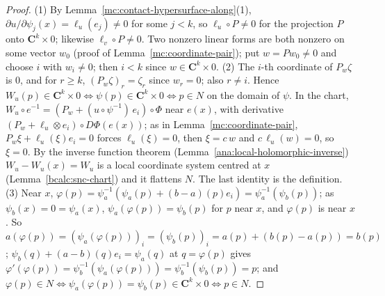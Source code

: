 \begin{proof}
\leanok
(1) By Lemma~\ref{mc:contact-hypersurface-along}(1), \(\partial u/\partial\psi_j(x)=\ell_u(e_j)\ne0\) for some \(j<k\), so \(\ell_u\circ P\ne0\) for the projection \(P\) onto
\(\mathbf C^k\times0\); likewise \(\ell_v\circ P\ne0\). Two nonzero linear forms are both nonzero on some vector \(w_0\) (proof of Lemma~\ref{mc:coordinate-pair}); put \(w=Pw_0\ne0\)
and choose \(i\) with \(w_i\ne0\); then \(i<k\) since \(w\in\mathbf C^k\times0\).
(2) The \(i\)-th coordinate of \(P_w\zeta\) is \(0\), and for \(r\ge k\), \((P_w\zeta)_r=\zeta_r\) since \(w_r=0\); also \(r\ne i\). Hence \(W_u(p)\in\mathbf C^k\times0\iff\psi(p)\in\mathbf C^k\times0\iff
p\in N\) on the domain of \(\psi\). In the chart, \(W_u\circ e^{-1}=(P_w+(u\circ\psi^{-1})\,e_i)\circ\Phi\) near \(e(x)\), with derivative \((P_w+\ell_u\otimes e_i)\circ D\Phi(e(x))\); as in
Lemma~\ref{mc:coordinate-pair}, \(P_w\xi+\ell_u(\xi)e_i=0\) forces \(\ell_u(\xi)=0\), then \(\xi=c\,w\) and \(c\,\ell_u(w)=0\), so \(\xi=0\). By the inverse function theorem
(Lemma~\ref{ana:local-holomorphic-inverse}) \(W_u-W_u(x)=W_u\) is a local coordinate system centred at \(x\) (Lemma~\ref{bcalc:snc-chart}) and it flattens \(N\). The last identity is the
definition.
(3) Near \(x\), \(\varphi(p)=\psi_a^{-1}(\psi_a(p)+(b-a)(p)e_i)=\psi_a^{-1}(\psi_b(p))\); as \(\psi_b(x)=0=\psi_a(x)\), \(\psi_a(\varphi(p))=\psi_b(p)\) for \(p\) near \(x\), and
\(\varphi(p)\) is near \(x\). So \(a(\varphi(p))=(\psi_a(\varphi(p)))_i=(\psi_b(p))_i=a(p)+(b(p)-a(p))=b(p)\); \(\psi_b(q)+(a-b)(q)e_i=\psi_a(q)\) at \(q=\varphi(p)\) gives
\(\varphi'(\varphi(p))=\psi_b^{-1}(\psi_a(\varphi(p)))=\psi_b^{-1}(\psi_b(p))=p\); and \(\varphi(p)\in N\iff\psi_a(\varphi(p))=\psi_b(p)\in\mathbf C^k\times0\iff p\in N\).
\end{proof}

